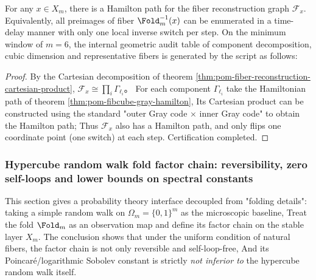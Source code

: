 \begin{corollary}\label{cor:pom-fiber-constant-delay-traversal}
For any \(x\in X_m\), there is a Hamilton path for the fiber reconstruction graph \(\mathcal F_x\).
Equivalently, all preimages of fiber \(\Fold_m^{-1}(x)\) can be enumerated in a time-delay manner with only one local inverse switch per step.
On the minimum window of \(m=6\), the internal geometric audit table of component decomposition, cubic dimension and representative fibers is generated by the script as follows:

\end{corollary}
\begin{proof}
By the Cartesian decomposition of theorem \ref{thm:pom-fiber-reconstruction-cartesian-product},
\(
\mathcal F_x\cong \prod_i \Gamma_{\ell_i}
\)。
For each component \(\Gamma_{\ell_i}\) take the Hamiltonian path of theorem \ref{thm:pom-fibcube-gray-hamilton},
Its Cartesian product can be constructed using the standard "outer Gray code \(\times\) inner Gray code" to obtain the Hamilton path;
Thus \(\mathcal F_x\) also has a Hamilton path, and only flips one coordinate point (one switch) at each step.
Certification completed.
\end{proof}

\subsubsection{Hypercube random walk fold factor chain: reversibility, zero self-loops and lower bounds on spectral constants}\label{subsubsec:pom-fold-factor-chain}

This section gives a probability theory interface decoupled from "folding details": taking a simple random walk on \(\Omega_m=\{0,1\}^m\) as the microscopic baseline,
Treat the fold \(\Fold_m\) as an observation map and define its factor chain on the stable layer \(X_m\).
The conclusion shows that under the uniform condition of natural fibers, the factor chain is not only reversible and self-loop-free,
And its Poincar\'e/logarithmic Sobolev constant is strictly \emph{not inferior to} the hypercube random walk itself.

